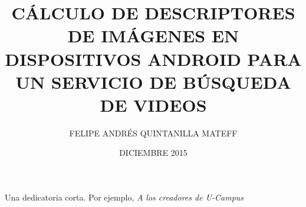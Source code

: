 \documentclass[upright, contnum]{umemoria}
\author{FELIPE ANDRÉS QUINTANILLA MATEFF}
\title{CÁLCULO DE DESCRIPTORES DE IMÁGENES EN DISPOSITIVOS ANDROID PARA UN SERVICIO DE BÚSQUEDA DE VIDEOS}
\date{DICIEMBRE 2015}
\begin{document}
\frontmatter
\maketitle

\begin{abstract}
{\lipsum[1-4]}
\end{abstract}

\begin{dedicatoria} %
Una dedicatoria corta. Por ejemplo, \emph{A los creadores de U-Campus}
\end{dedicatoria}

\begin{thanks} %
\lipsum[1-2]
\end{thanks}
\cleardoublepage

\tableofcontents
\listoffigures %

\mainmatter
%












\end{document}
